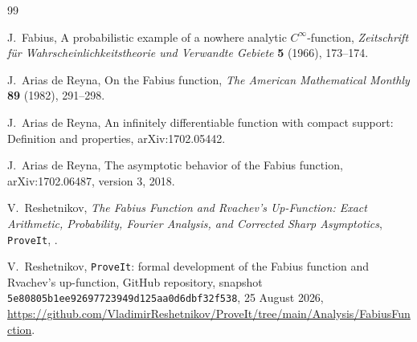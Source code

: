 \documentclass[11pt,oneside]{article}
\theoremstyle{definition}
\theoremstyle{remark}
\begin{document}
\nocite{fabius1966,arias1982,arias05442,arias2018,mainarticle,repo}
\begin{thebibliography}{99}

J.~Fabius,
\newblock A probabilistic example of a nowhere analytic $C^\infty$-function,
\newblock \emph{Zeitschrift f\"ur Wahrscheinlichkeitstheorie und Verwandte Gebiete}
\textbf{5} (1966), 173--174.

J.~Arias de Reyna,
\newblock On the Fabius function,
\newblock \emph{The American Mathematical Monthly} \textbf{89} (1982), 291--298.

J.~Arias de Reyna,
\newblock An infinitely differentiable function with compact support: Definition and properties,
\newblock arXiv:1702.05442.

J.~Arias de Reyna,
\newblock The asymptotic behavior of the Fabius function,
\newblock arXiv:1702.06487, version 3, 2018.

V.~Reshetnikov,
\newblock \emph{The Fabius Function and Rvachev's Up-Function: Exact Arithmetic,
Probability, Fourier Analysis, and Corrected Sharp Asymptotics},
\newblock \texttt{ProveIt},
.

V.~Reshetnikov,
\newblock \texttt{ProveIt}: formal development of the Fabius function and Rvachev's
up-function,
\newblock GitHub repository, snapshot
\texttt{5e80805b1ee92697723949d125aa0d6dbf32f538}, 25 August 2026,
\newblock \url{https://github.com/VladimirReshetnikov/ProveIt/tree/main/Analysis/FabiusFunction}.

\end{thebibliography}
\end{document}
